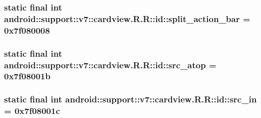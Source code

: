 \hypertarget{classandroid_1_1support_1_1v7_1_1cardview_1_1_r_1_1id_88cf906d6fc1396061dcd74bd9adad6d}{
\subsubsection[{split\_\-action\_\-bar}]{\setlength{\rightskip}{0pt plus 5cm}static final int android::support::v7::cardview.R.R::id::split\_\-action\_\-bar = 0x7f080008}}
\label{classandroid_1_1support_1_1v7_1_1cardview_1_1_r_1_1id_88cf906d6fc1396061dcd74bd9adad6d}


\hypertarget{classandroid_1_1support_1_1v7_1_1cardview_1_1_r_1_1id_91896965038fa2d0f08b0cd0699abfb6}{
\subsubsection[{src\_\-atop}]{\setlength{\rightskip}{0pt plus 5cm}static final int android::support::v7::cardview.R.R::id::src\_\-atop = 0x7f08001b}}
\label{classandroid_1_1support_1_1v7_1_1cardview_1_1_r_1_1id_91896965038fa2d0f08b0cd0699abfb6}


\hypertarget{classandroid_1_1support_1_1v7_1_1cardview_1_1_r_1_1id_207f064db0cfea500464aa5960581efc}{
\subsubsection[{src\_\-in}]{\setlength{\rightskip}{0pt plus 5cm}static final int android::support::v7::cardview.R.R::id::src\_\-in = 0x7f08001c}}
\label{classandroid_1_1support_1_1v7_1_1cardview_1_1_r_1_1id_207f064db0cfea500464aa5960581efc}


